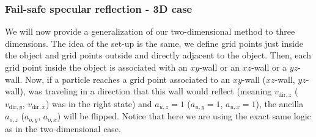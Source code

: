 



\subsubsection{Fail-safe specular reflection - 3D case}\label{ssec:spec ref 3d}
We will now provide a generalization of our two-dimensional method to three dimensions. The idea of the set-up is the same, we define grid points just inside the object and grid points outside and directly adjacent to the object. 
Then, each grid point inside the object is associated with an $xy$-wall or an $xz$-wall or a $yz$-wall.
Now, if a particle reaches a grid point associated to an $xy$-wall ($xz$-wall, $yz$-wall), was traveling in a direction that this wall would reflect (meaning $v_{\text{dir},z}$ ($v_{\text{dir},y}$, $v_{\text{dir},x}$) was in the right state) and $a_{u,z}=1$ ($a_{u,y}=1$, $a_{u,x}=1$), the ancilla $a_{o,z}$ ($a_{o,y}$, $a_{o,x}$) will be flipped. Notice that here we are using the exact same logic as in the two-dimensional case.

